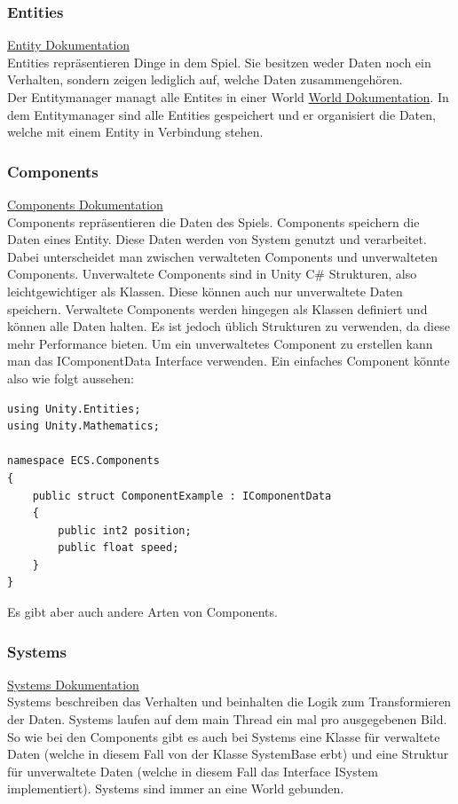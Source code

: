 \documentclass[12pt, titlepage]{article}
\begin{document}
\subsubsection{Entities}
\href{https://docs.unity3d.com/Packages/com.unity.entities@1.0/manual/concepts-entities.html}{Entity Dokumentation}\\Entities repräsentieren Dinge in dem Spiel. Sie besitzen weder Daten noch ein Verhalten, sondern zeigen lediglich auf, welche Daten zusammengehören. \\Der Entitymanager managt alle Entites in einer World \href{https://docs.unity3d.com/Packages/com.unity.entities@0.1/manual/world.html}{World Dokumentation}. In dem Entitymanager sind alle Entities gespeichert und er organisiert die Daten, welche mit einem Entity in Verbindung stehen. 
\subsubsection{Components}
\href{https://docs.unity3d.com/Packages/com.unity.entities@1.0/manual/concepts-components.html}{Components Dokumentation}\\Components repräsentieren die Daten des Spiels. Components speichern die Daten eines Entity. Diese Daten werden von System genutzt und verarbeitet. Dabei unterscheidet man zwischen verwalteten Components und unverwalteten Components. Unverwaltete Components sind in Unity C\# Strukturen, also leichtgewichtiger als Klassen. Diese können auch nur unverwaltete Daten speichern. Verwaltete Components werden hingegen als Klassen definiert und können alle Daten halten. Es ist jedoch üblich Strukturen zu verwenden, da diese mehr Performance bieten. Um ein unverwaltetes Component zu erstellen kann man das IComponentData Interface verwenden. Ein einfaches Component könnte also wie folgt aussehen:\begin{lstlisting}[style=code, caption={Beispiel Komponente}]
using Unity.Entities;
using Unity.Mathematics;

namespace ECS.Components
{
    public struct ComponentExample : IComponentData
    {
        public int2 position;
        public float speed;
    }
}
\end{lstlisting}
Es gibt aber auch andere Arten von Components. 
\subsubsection{Systems}
\href{https://docs.unity3d.com/Packages/com.unity.entities@1.0/manual/concepts-systems.html}{Systems Dokumentation}\\
Systems beschreiben das Verhalten und beinhalten die Logik zum Transformieren der Daten. Systems laufen auf dem main Thread ein mal pro ausgegebenen Bild. So wie bei den Components gibt es auch bei Systems eine Klasse für verwaltete Daten (welche in diesem Fall von der Klasse SystemBase erbt) und eine Struktur für unverwaltete Daten (welche in diesem Fall das Interface ISystem implementiert). Systems sind immer an eine World gebunden.
\end{document}
